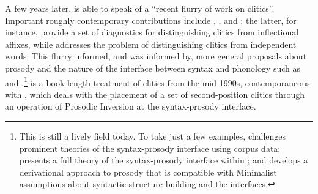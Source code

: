 \documentclass[output=paper]{../langscibook}
\begin{document}
A few years later, \citet[283]{Zwicky1985} is able to speak of a ``recent flurry of work on clitics''. Important roughly contemporary contributions include \citet{Klavans1979,Klavans1982,Klavans1985},  \citet{Kaisse1982,Kaisse1985}, and \citet{ZwickyPullum1983}; the latter, for instance, provide a set of diagnostics for distinguishing clitics from inflectional affixes, while \citet{Zwicky1985} addresses the problem of distinguishing clitics from independent words. This flurry informed, and was informed by, more general proposals about prosody and the nature of the interface between syntax and phonology such as \citet{Selkirk1984,Selkirk1986} and \citet{NesporVogel1986}.\footnote{This is still a lively field today. To take just a few examples, \citet{Dehe2014} challenges prominent theories of the syntax-prosody interface using corpus data; \citet{Boegel2015} presents a full theory of the syntax-prosody interface within ; and \citet{Guenes2015} develops a derivational approach to prosody that is compatible with Minimalist assumptions about syntactic structure-building and the interfaces.} \citet{Klavans1995} is a book-length treatment of clitics from the mid-1990s, contemporaneous with \citet{Halpern1995}, which deals with the placement of a set of second-position clitics through an operation of Prosodic Inversion at the syntax-prosody interface.
\end{document}
